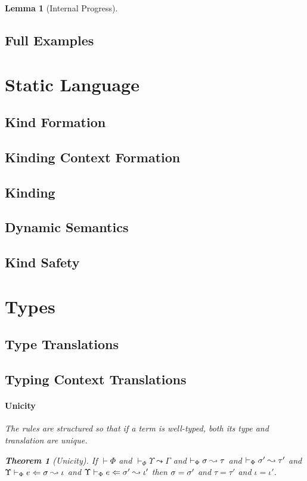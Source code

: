 \documentclass[10pt,preprint]{sigplanconf}
\newtheorem{theorem}{Theorem}
\newtheorem{lemma}{Lemma}
\begin{document}
\begin{lemma}[Internal Progress]
\subsection{Full Examples}

\section{Static Language}
\subsection{Kind Formation}

\subsection{Kinding Context Formation}

\subsection{Kinding}

\subsection{Dynamic Semantics}

\subsection{Kind Safety}

\section{Types}
\subsection{Type Translations}

\subsection{Typing Context Translations}

\paragraph{Unicity}
The rules are structured so that if a term is well-typed, both its type and translation are unique.
\begin{theorem}[Unicity]
If $\vdash \Phi$ and $\vdash_\Phi \Upsilon \leadsto \Gamma$ and $\vdash_\Phi \sigma \leadsto \tau$ and $\vdash_\Phi \sigma' \leadsto \tau'$ and $\Upsilon \vdash_{\Phi} e \Leftarrow \sigma \leadsto \iota$ and $\Upsilon \vdash_{\Phi} e \Leftarrow \sigma' \leadsto \iota'$ then $\sigma = \sigma'$ and $\tau=\tau'$ and $\iota = \iota'$.
\end{theorem}


\end{lemma}
\end{document}
